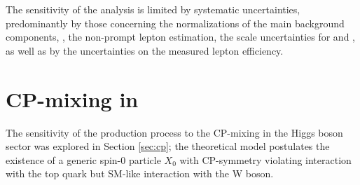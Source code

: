 The sensitivity of the analysis is limited by systematic uncertainties, predominantly by those concerning the normalizations of the main background components, \ie, the non-prompt lepton estimation, the scale uncertainties for \ttW and \ttZ, as well as by the uncertainties on the measured lepton efficiency.

\section{CP-mixing in \tHq}

The sensitivity of the \tH production process to the CP-mixing in the Higgs boson sector was explored in Section \ref{sec:cp}; the theoretical model postulates the existence of a generic spin-0 particle $X_0$ with CP-symmetry violating interaction with the top quark but SM-like interaction with the W boson.

